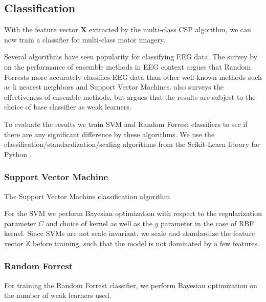 \subsection{Classification}
With the feature vector $\mathbf{X}$ extracted by the multi-class CSP algorithm, we can now train a classifier for multi-class motor imagery.

Several algorithms have seen popularity for classifying EEG data. The survey by \citet{chan2015systematic} on the performance of ensemble methods in EEG context argues that Random Forrests more accurately classifies EEG data than other well-known methods such as k nearest neighbors and Support Vector Machines. \citet{sun2007experimental} also surveys the effectiveness of ensemble methods, but argues that the results are subject to the choice of base classifier as weak learners.

To evaluate the results we train SVM and Random Forrest classifiers to see if there are any significant difference by these algorithms. We use the classification/standardization/scaling algorithms from the Scikit-Learn library for Python \citep{sklearn}.  

\subsubsection{Support Vector Machine}
The Support Vector Machine classification algorithm 

For the SVM we perform Bayesian optimization with respect to the regularization parameter $C$ and choice of kernel as well as the $y$ parameter in the case of RBF kernel. Since SVMs are not scale invariant, we scale and standardize the feature vector $\mathbb{X}$ before training, such that the model is not dominated by a few features.

\subsubsection{Random Forrest}
For training the Random Forrest classifier, we perform Bayesian optimization on the number of weak learners used.